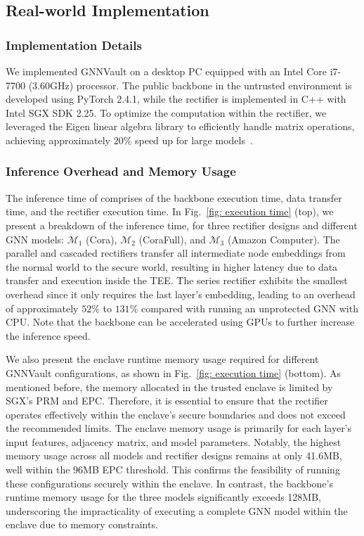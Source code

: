 \subsection{Real-world Implementation} \label{exp: implementation}

\subsubsection{Implementation Details} 
We implemented GNNVault on a desktop PC equipped with an Intel Core i7-7700 (3.60GHz) processor. The public backbone in the untrusted environment is developed using PyTorch 2.4.1, while the rectifier is implemented in C++ with Intel SGX SDK 2.25. 
To optimize the computation within the rectifier, we leveraged the Eigen linear algebra library to efficiently handle matrix operations, achieving approximately 20\% speed up for large models~\cite{eigen}. 

\subsubsection{Inference Overhead and Memory Usage}
The inference time of \mymethod comprises of the backbone execution time, data transfer time, and the rectifier execution time. 
In Fig.~\ref{fig: execution time} (top), we present a breakdown of the inference time, for three rectifier designs and different GNN models: $\mathcal{M}_1$ (Cora), $\mathcal{M}_2$ (CoraFull), and $\mathcal{M}_3$ (Amazon Computer). The parallel and cascaded rectifiers transfer all intermediate node embeddings from the normal world to the secure world, resulting in higher latency due to data transfer and execution inside the TEE. The series rectifier exhibits the smallest overhead since it only requires the last layer's embedding, leading to an overhead of approximately $52\%$ to $131\%$ compared with running an unprotected GNN with CPU. Note that the backbone can be accelerated using GPUs to further increase the inference speed.


We also present the enclave runtime memory usage required for different GNNVault configurations, as shown in Fig.~\ref{fig: execution time} (bottom). As mentioned before, the memory allocated in the trusted enclave is limited by SGX's PRM and EPC.
Therefore, it is essential to %
ensure that the rectifier operates effectively within the enclave's secure boundaries and does not exceed the recommended limits.
The enclave memory usage is primarily for each layer’s input features, adjacency matrix, and model parameters. Notably, the highest memory usage across all models and rectifier designs remains at only 41.6MB, well within the 96MB EPC threshold. This confirms the feasibility of running these configurations securely within the enclave. In contrast, the backbone’s runtime memory usage for the three models significantly exceeds 128MB, underscoring the impracticality of executing a complete GNN model within the enclave due to memory constraints.

